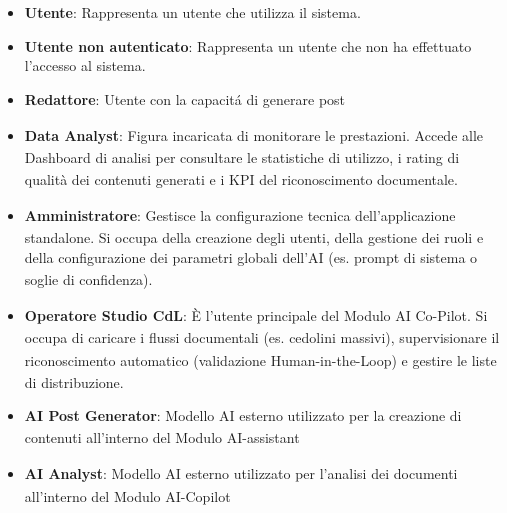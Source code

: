 ﻿\documentclass[a4paper,11pt]{article}
\begin{document}
\begin{itemize}
    \item \textbf{Utente}: Rappresenta un utente che utilizza il sistema.
    \item \textbf{Utente non autenticato}: Rappresenta un utente che non ha effettuato l'accesso al sistema.
    \item \textbf{Redattore\textsubscript{}}: Utente con la capacitá di generare post
    \item \textbf{Data Analyst\textsubscript{}}: Figura incaricata di monitorare le prestazioni. Accede alle Dashboard\textsubscript{} di analisi per consultare le statistiche di utilizzo, i rating di qualità\textsubscript{} dei contenuti generati e i KPI\textsubscript{} del riconoscimento documentale.
    \item \textbf{Amministratore\textsubscript{}}: Gestisce la configurazione tecnica dell'applicazione standalone. Si occupa della creazione degli utenti, della gestione dei ruoli e della configurazione dei parametri globali dell'AI\textsubscript{} (es. prompt\textsubscript{} di sistema o soglie di confidenza\textsubscript{}\textsubscript{}).
    \item \textbf{Operatore Studio CdL\textsubscript{}}: È l'utente principale del Modulo\textsubscript{} AI Co-Pilot\textsubscript{}. Si occupa di caricare i flussi documentali (es. cedolini massivi\textsubscript{}), supervisionare il riconoscimento automatico (validazione\textsubscript{} Human-in-the-Loop) e gestire le liste di distribuzione.
    \item \textbf{AI Post Generator}: Modello AI\textsubscript{} esterno utilizzato per la creazione di contenuti all'interno del Modulo\textsubscript{} AI\textsubscript{}-assistant
    \item \textbf{AI Analyst}: Modello AI\textsubscript{} esterno utilizzato per l'analisi dei documenti all'interno del Modulo\textsubscript{} AI-Copilot\textsubscript{}
\end{itemize}
\end{document}
